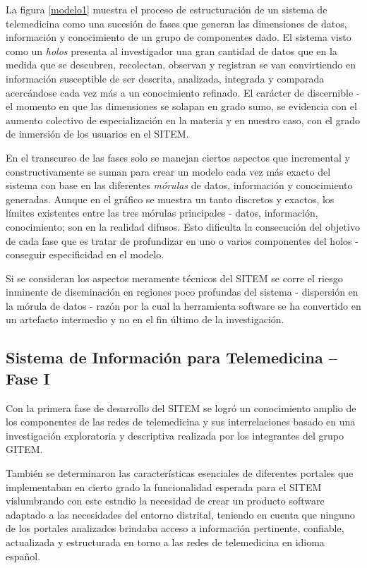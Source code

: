La figura \ref{modelo1} muestra el proceso de estructuración de un sistema de telemedicina como una sucesión de fases que generan las dimensiones de datos, información y conocimiento de un grupo de componentes dado. El sistema visto como un \textit{holos} presenta al investigador una gran cantidad de datos que en la medida que se descubren, recolectan, observan y registran se van convirtiendo en información susceptible de ser descrita, analizada, integrada y comparada acercándose cada vez más a un conocimiento refinado. El carácter de discernible - el momento en que las dimensiones se solapan en grado sumo, se evidencia con el aumento colectivo de especialización en la materia y en nuestro caso, con el grado de inmersión de los usuarios en el SITEM.

En el transcurso de las fases solo se manejan ciertos aspectos que incremental y constructivamente se suman para crear un modelo cada vez más exacto del sistema con base en las diferentes \textit{mórulas} de datos, información y conocimiento generadas. Aunque en el gráfico se muestra un tanto discretos y exactos, los límites existentes entre las tres mórulas principales - datos, información, conocimiento; son en la realidad difusos. Esto dificulta la consecución del objetivo de cada fase que es tratar de profundizar en uno o varios componentes del holos - conseguir especificidad en el modelo.

Si se consideran los aspectos meramente técnicos del SITEM se corre el riesgo inminente de diseminación en regiones poco profundas del sistema - dispersión en la mórula de datos - razón por la cual la herramienta software se ha convertido en un artefacto intermedio y no en el fin último de la investigación.

\subsection{Sistema de Información para Telemedicina – Fase I}
Con la primera fase de desarrollo del SITEM se logró un conocimiento amplio de los componentes de las redes de telemedicina y sus interrelaciones basado en una investigación exploratoria y descriptiva realizada por los integrantes del grupo GITEM. 

También se determinaron las características esenciales de diferentes portales que implementaban en cierto grado la funcionalidad esperada para el SITEM vislumbrando con este estudio la necesidad de crear un producto software adaptado a las necesidades del entorno distrital, teniendo en cuenta que ninguno de los portales analizados brindaba acceso a información pertinente, confiable, actualizada y estructurada en torno a las redes de telemedicina en idioma español.

